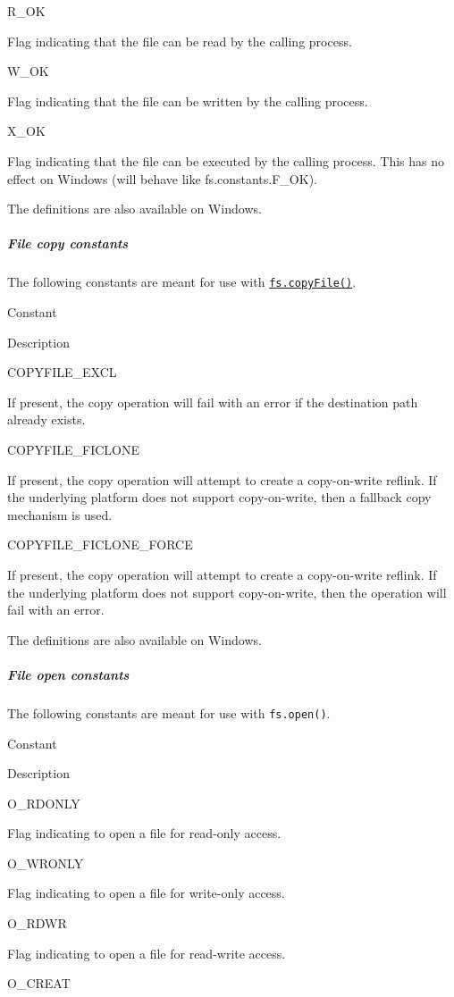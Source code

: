 R\_OK

Flag indicating that the file can be read by the calling process.

W\_OK

Flag indicating that the file can be written by the calling process.

X\_OK

Flag indicating that the file can be executed by the calling process.
This has no effect on Windows (will behave like fs.constants.F\_OK).

The definitions are also available on Windows.

\subparagraph{File copy constants}\label{file-copy-constants}

The following constants are meant for use with
\hyperref[fscopyfilesrc-dest-mode-callback]{\texttt{fs.copyFile()}}.

Constant

Description

COPYFILE\_EXCL

If present, the copy operation will fail with an error if the
destination path already exists.

COPYFILE\_FICLONE

If present, the copy operation will attempt to create a copy-on-write
reflink. If the underlying platform does not support copy-on-write, then
a fallback copy mechanism is used.

COPYFILE\_FICLONE\_FORCE

If present, the copy operation will attempt to create a copy-on-write
reflink. If the underlying platform does not support copy-on-write, then
the operation will fail with an error.

The definitions are also available on Windows.

\subparagraph{File open constants}\label{file-open-constants}

The following constants are meant for use with \texttt{fs.open()}.

Constant

Description

O\_RDONLY

Flag indicating to open a file for read-only access.

O\_WRONLY

Flag indicating to open a file for write-only access.

O\_RDWR

Flag indicating to open a file for read-write access.

O\_CREAT

